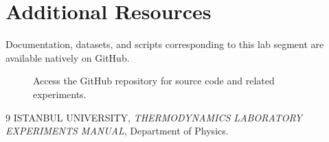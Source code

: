 \documentclass[journal]{IEEEtran}
\begin{document}
\section{Additional Resources}
Documentation, datasets, and scripts corresponding to this lab segment are available natively on GitHub.

\begin{figure}[H]
    \centering
    \begin{minipage}{0.15\textwidth}
        \centering
    \end{minipage}%
    \begin{minipage}{0.2\textwidth}
        \raggedright
        \caption{Access the GitHub repository for source code and related experiments.}
        \label{fig:qr_code}
    \end{minipage}
\end{figure}

\begin{thebibliography}{9}
    ISTANBUL UNIVERSITY, \textit{THERMODYNAMICS LABORATORY EXPERIMENTS MANUAL}, Department of Physics.

\end{thebibliography}
\end{document}
